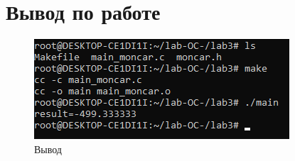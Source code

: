 \documentclass[a4paper,14pt]{extarticle}
\begin{document}
\section{Вывод по работе}
\begin{figure}[h!]
\centering
\includegraphics[width=1\linewidth]{vivod.png}
\caption{Вывод}
\label{fig:mpr}
\end{figure}



% 
% 
% 
% 
% 
% 
%
%
%  
%  
%  
\end{document}
